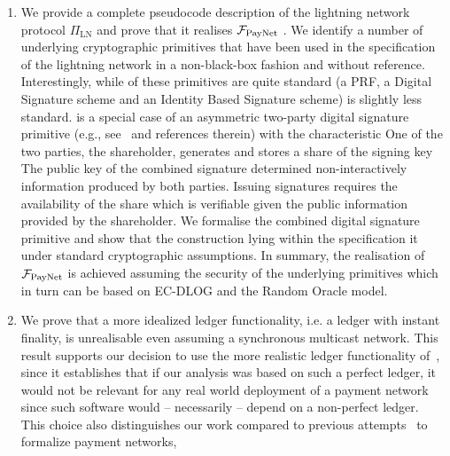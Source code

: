 \begin{enumerate}
\item We provide a complete pseudocode description of the lightning network
protocol $\Pi_{\mathrm{LN}}$ and prove that it realises $\mathcal{F}_{\mathrm{PayNet}}{}$ . We identify a number of underlying cryptographic
primitives that have been used in the specification of the lightning network in
a non-black-box fashion and without reference. Interestingly, while
 of these primitives are quite standard (a PRF, a Digital Signature
scheme and an Identity Based Signature scheme) is
slightly less standard.  is a special case of an asymmetric two-party digital
signature primitive (e.g., see~\cite{DBLP:conf/ndss/NicolosiKDM03} and
references therein) with the  characteristic\redden{:} One of
the two parties, the shareholder, generates and stores a share of the signing
key The public key of the combined signature 
determined non-interactively  information produced by both
parties. Issuing signatures requires the availability of the share\redden{,}
which is verifiable given the public information provided by the shareholder. We
formalise the combined digital signature primitive and show that the
construction lying within the  specification 
it under standard cryptographic assumptions. In summary, the realisation of
$\mathcal{F}_{\mathrm{PayNet}}{}$ is achieved assuming the security of the underlying
primitives\redden{,} which in turn can be based on EC-DLOG and the Random Oracle
model.

\item We prove that a more idealized ledger functionality, i.e. a ledger with
instant finality, is unrealisable even assuming a synchronous multicast network.
This result supports our decision to use the more realistic ledger functionality
of~\cite{BMTZ17}, since it establishes that if our analysis was based on such a
perfect ledger, it would not be relevant for any real world deployment of a
payment network since such software would -- necessarily -- depend on a
non-perfect ledger. This choice also distinguishes our work compared to previous
attempts~\cite{DBLP:conf/ccs/DziembowskiFH18,Malavolta:2017:CPP:3133956.3134096,sprites,perun}
to formalize payment networks, 
\end{enumerate}

